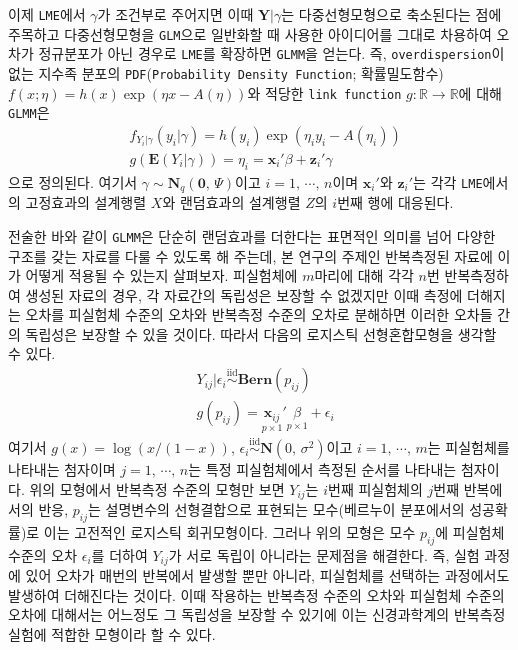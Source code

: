 \documentclass[10pt,onecolumn,twoside,a4size]{gsag3jnl}
\newcommand{\iid}{\stackrel{\mathrm{iid}}{\sim}}
\begin{document}
이제 \texttt{LME}에서 $\gamma$가 조건부로 주어지면 이때 $\mathbf{Y}\vert\gamma$는 다중선형모형으로 축소된다는 점에 주목하고 다중선형모형을 \texttt{GLM}으로 일반화할 때 사용한 아이디어를 그대로 차용하여 오차가 정규분포가 아닌 경우로 \texttt{LME}를 확장하면 \texttt{GLMM}을 얻는다. 즉, \texttt{overdispersion}이 없는 지수족 분포의 \texttt{PDF}(\texttt{Probability Density Function}; 확률밀도함수) $f(x;\eta)=h(x)\exp(\eta x-A(\eta))$와 적당한 \texttt{link function} $g:\mathbb{R}\to\mathbb{R}$에 대해 \texttt{GLMM}은 
\begin{align}\label{eq:glmm_model}
  &f_{Y_i\vert\gamma}(y_i\vert\gamma)=h(y_i)\exp(\eta_iy_i-A(\eta_i))\\
  &g(\mathbf{E}(Y_i\vert\gamma))=\eta_i=\mathbf{x}_i'\beta+\mathbf{z}_i'\gamma\nonumber
\end{align}
으로 정의된다. 여기서 $\gamma\sim\mathbf{N}_q(\mathbf{0},\,\Psi)$이고 $i=1,\,\cdots,\,n$이며 $\mathbf{x}_i'$와 $\mathbf{z}_i'$는 각각 \texttt{LME}에서의 고정효과의 설계행렬 $X$와 랜덤효과의 설계행렬 $Z$의 $i$번째 행에 대응된다.

전술한 바와 같이 \texttt{GLMM}은 단순히 랜덤효과를 더한다는 표면적인 의미를 넘어 다양한 구조를 갖는 자료를 다룰 수 있도록 해 주는데, 본 연구의 주제인 반복측정된 자료에 이가 어떻게 적용될 수 있는지 살펴보자. 피실험체에 $m$마리에 대해 각각 $n$번 반복측정하여 생성된 자료의 경우, 각 자료간의 독립성은 보장할 수 없겠지만 이때 측정에 더해지는 오차를 피실험체 수준의 오차와 반복측정 수준의 오차로 분해하면 이러한 오차들 간의 독립성은 보장할 수 있을 것이다. 따라서 다음의 로지스틱 선형혼합모형을 생각할 수 있다.
\begin{align}\label{eq:hierachy_model}
  &Y_{ij}\vert\epsilon_i\iid\mathbf{Bern}(p_{ij})\\
  &g(p_{ij})=\underset{p\times1}{\mathbf{x}_{ij}}'\underset{p\times1}{\beta}+\epsilon_i\nonumber
\end{align}
여기서 $g(x)=\log(x/(1-x))$, $\epsilon_i\iid\mathbf{N}(0,\,\sigma^2)$이고 $i=1,\,\cdots,\,m$는 피실험체를 나타내는 첨자이며 $j=1,\,\cdots,\,n$는 특정 피실험체에서 측정된 순서를 나타내는 첨자이다. 위의 모형에서 반복측정 수준의 모형만 보면 $Y_{ij}$는 $i$번째 피실험체의 $j$번째 반복에서의 반응, $p_{ij}$는 설명변수의 선형결합으로 표현되는 모수(베르누이 분포에서의 성공확률)로 이는 고전적인 로지스틱 회귀모형이다. 그러나 위의 모형은 모수 $p_{ij}$에 피실험체 수준의 오차 $\epsilon_i$를 더하여 $Y_{ij}$가 서로 독립이 아니라는 문제점을 해결한다. 즉, 실험 과정에 있어 오차가 매번의 반복에서 발생할 뿐만 아니라, 피실험체를 선택하는 과정에서도 발생하여 더해진다는 것이다. 이때 작용하는 반복측정 수준의 오차와 피실험체 수준의 오차에 대해서는 어느정도 그 독립성을 보장할 수 있기에 이는 신경과학계의 반복측정 실험에 적합한 모형이라 할 수 있다.
\end{document}
